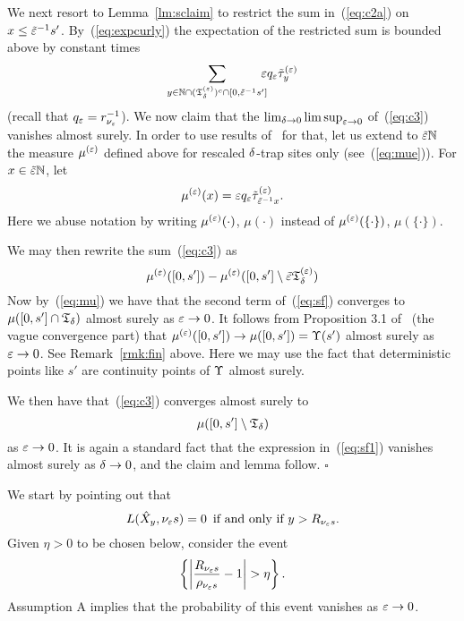 We next resort to Lemma~\ref{lm:sclaim} to restrict the sum in~(\ref{eq:c2a}) on $x\leq \tilde{\varepsilon}^{-1}s'$. 
By~(\ref{eq:expcurly}) the expectation of the restricted sum is bounded above by constant times 
\begin{equation}
\label{eq:c3}
\sum_{y\in\N\cap(\teps_\delta)^c\cap[0,\te^{-1}s']}\!\!\!\!\eps q_\eps\tilde\tau_{y}^{(\eps)} 
\end{equation}
(recall that $q_\varepsilon=r_{\nu_\varepsilon}^{-1}$). We now claim that the $\lim_{\delta\to0}\limsup_{\varepsilon\to0}$ 
of~(\ref{eq:c3}) vanishes almost surely. In order to use results of~\cite{kn:FIN} for that, let us
extend to $\tilde{\varepsilon}{\mathbb N}$ the measure $\mu^{(\varepsilon)}$ defined above for rescaled $\delta$-trap sites only (see~(\ref{eq:mue})).
For $x\in\tilde{\varepsilon}{\mathbb N}$, let
\begin{equation}
 \label{eq:muee}
\mue(x)=\eps q_\eps\tilde\tau_{\te^{-1}x}^{(\eps)}.
\end{equation} 
Here we abuse notation by writing $\mu^{(\varepsilon)}(\cdot)$, $\mu(\cdot)$ instead of $\mu^{(\varepsilon)}(\{\cdot\})$, $\mu(\{\cdot\})$.

We may then rewrite the sum~(\ref{eq:c3}) as 
\begin{equation}
\label{eq:sf}
\mue([0,s'])-\mue([0,s']\setminus\te\t_\d^{(\eps)})
\end{equation}
Now by~(\ref{eq:mu}) we have that the second term of~(\ref{eq:sf}) converges to
$\mu([0,s']\cap{\mathfrak T}_\delta)$ almost surely as $\varepsilon\to0$. It follows from Proposition 3.1 of~\cite{kn:FIN} (the vague 
convergence part) that $\mu^{(\varepsilon)}([0,s'])\to\mu([0,s'])=\Upsilon(s')$ almost surely as $\varepsilon\to0$. See Remark~\ref{rmk:fin} 
above. Here we may use the fact that deterministic points like $s'$ are continuity points of $\Upsilon$ almost surely.

We then have that~(\ref{eq:c3}) converges almost surely to 
\begin{equation}
\label{eq:sf1}
\mu([0,s']\setminus\t_\d) 
\end{equation}
as $\varepsilon\to0$. It is again a standard fact that the expression in~(\ref{eq:sf1}) vanishes 
almost surely as $\delta\to0$, and the claim and lemma follow. 
%
$\square$


\medskip




We start by pointing out that
\begin{equation}
\label{eq:condl}
L(\txt_y,\nu_\eps s)=0 \,\mbox{ if and only if } y>R_{\nu_\eps s}. 
\end{equation}
Given $\eta>0$ to be chosen below, consider the event
\begin{equation}
\label{eq:event}
\left\{\left|\frac{R_{\nu_\eps s}}{\rho_{\nu_\eps s}}-1\right|>\eta\right\}.
\end{equation}
Assumption A implies that the probability of this event vanishes as $\varepsilon\to0$.

